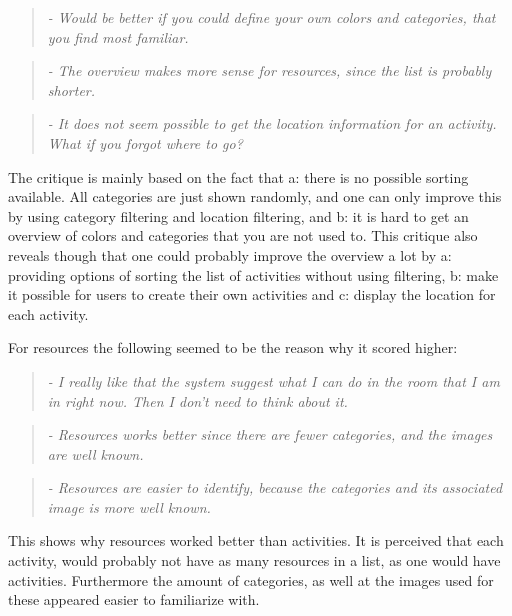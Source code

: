 \begin{quotation}
	\emph{
		- Would be better if you could define your own colors and categories, that you find most familiar.
	}
\end{quotation}

\begin{quotation}
	\emph{
		- The overview makes more sense for resources, since the list is probably shorter.
	}
\end{quotation}

\begin{quotation}
	\emph{
		- It does not seem possible to get the location information for an activity. What if you forgot where to go?
	}
\end{quotation}

The critique is mainly based on the fact that a: there is no possible sorting available. All categories are just shown randomly, and one can only improve this by using category filtering and location filtering, and b: it is hard to get an overview of colors and categories that you are not used to. This critique also reveals though that one could probably improve the overview a lot by a: providing options of sorting the list of activities without using filtering, b: make it possible for users to create their own activities and c: display the location for each activity.

For resources the following seemed to be the reason why it scored higher:

\begin{quotation}
	\emph{
		- I really like that the system suggest what I can do in the room that I am in right now. Then I don't need to think about it.
	}
\end{quotation}

\begin{quotation}
	\emph{
		- Resources works better since there are fewer categories, and the images are well known.
	}
\end{quotation}

\begin{quotation}
	\emph{
		- Resources are easier to identify, because the categories and its associated image is more well known.
	}
\end{quotation}

This shows why resources worked better than activities. It is perceived that each activity, would probably not have as many resources in a list, as one would have activities. Furthermore the amount of categories, as well at the images used for these appeared easier to familiarize with.

